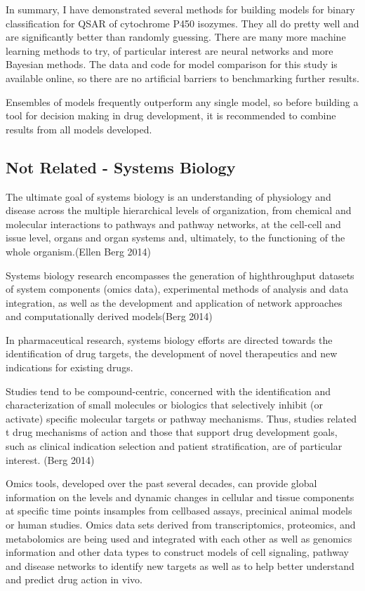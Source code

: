 In summary, I have demonstrated several methods for building models for binary classification for QSAR of cytochrome P450 isozymes. They all do pretty well and are significantly better than randomly guessing.
There are many more machine learning methods to try, of particular interest are neural networks and more Bayesian methods. The data and code for model comparison for this study is available online, so there are no artificial barriers to benchmarking further results.

Ensembles of models frequently outperform any single model, so before building a tool for decision making in drug development, it is recommended to combine results from all models developed.


\subsection*{Not Related - Systems Biology}

The ultimate goal of systems biology is an understanding of physiology and disease across the multiple hierarchical levels of organization, from chemical and molecular interactions to pathways and pathway networks, at the cell-cell and issue level, organs and organ systems and, ultimately, to the functioning of the whole organism.(Ellen Berg 2014)

Systems biology research encompasses the generation of high­throughput datasets of system components (omics data), experimental methods of analysis and data integration, as well as the development and application of network approaches and computationally derived models(Berg 2014)

In pharmaceutical research, systems biology efforts are directed towards the identification of drug targets, the development of novel therapeutics and new indications for existing drugs.

Studies tend to be compound-centric, concerned with the identification and characterization of small molecules or biologics that selectively inhibit (or activate) specific molecular targets or pathway mechanisms. Thus, studies related t drug mechanisms of action and those that support drug development goals, such as clinical indication selection and patient stratification, are of particular interest. (Berg 2014)

Omics tools, developed over the past several decades, can provide global information on the levels and dynamic changes in cellular and tissue components at specific time points insamples from cell­based assays, precinical animal models or human studies. Omics data sets derived from transcriptomics, proteomics, and metabolomics are being used and integrated with each other as well as genomics information and other data types to construct models of cell signaling, pathway and disease networks to identify new targets as well as to help better understand and predict drug action in vivo.
